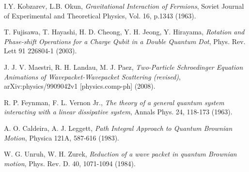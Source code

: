 \documentclass[12pt]{article}
\begin{document}
\begin{thebibliography}{9}
 I.Y. Kobzarev, L.B. Okun, \emph{Gravitational
  Interaction of Fermions}, Soviet Journal of Experimental and
  Theoretical Physics, Vol. 16, p.1343 (1963).

 T. Fujisawa, T. Hayashi, H. D. Cheong,
  Y. H. Jeong, Y. Hirayama, \emph{Rotation and Phase-shift Operations
    for a Charge Qubit in a Double Quantum Dot}, Phys. Rev. Lett 91
  226804-1 (2003).

 J. J. V. Maestri, R. H. Landau, M. J. Paez,
  \emph{Two-Particle Schroedinger Equation Animations of
    Wavepacket-Wavepacket Scattering (revised)},
  arXiv:physics/9909042v1 [physics.comp-ph] (2008).

 R. P. Feynman, F. L. Vernon Jr., \emph{The theory of
  a general quantum system interacting with a linear dissipative
  system}, Annals Phys. 24, 118-173 (1963).

 A. O. Caldeira, A. J. Leggett, \emph{Path Integral
  Approach to Quantum Brownian Motion}, Physica 121A, 587-616 (1983).

 W. G. Unruh, W. H. Zurek, \emph{Reduction of a wave
  packet in quantum Brownian motion}, Phys. Rev. D. 40, 1071-1094
  (1984).

\end{thebibliography}
\end{document}
